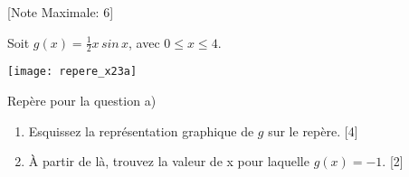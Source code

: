 \begin{question}
  \hspace*{\fill} [Note Maximale: 6]\par
  \medskip
  \noindent Soit $g(x) = \frac{1}{2}x\,sin\,x$, avec $0 \le x \le 4$.\par
  \begin{center} %
    \texttt{[image: repere\_x23a]}\par
    \noindent Repère pour la question a)\par
  \end{center} %
  \begin{enumerate}[label=(\alph*)]
    \item Esquissez la représentation graphique de $g$ sur le repère.\hspace*{\fill} [4]
    \item À partir de là, trouvez la valeur de x pour laquelle $g(x) = -1$.\hspace*{\fill} [2]
  \end{enumerate}
\end{question}

